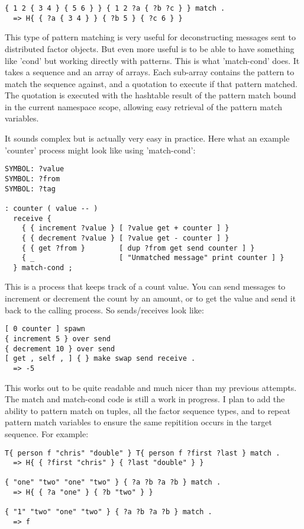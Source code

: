 \begin{verbatim}
{ 1 2 { 3 4 } { 5 6 } } { 1 2 ?a { ?b ?c } } match .
  => H{ { ?a { 3 4 } } { ?b 5 } { ?c 6 } }
\end{verbatim}


This type of pattern matching is very useful for deconstructing messages sent to distributed factor objects. But even more useful is to be able to have something like 'cond' but working directly with patterns. This is what 'match-cond' does. It takes a sequence and an array of arrays. Each sub-array contains the pattern to match the sequence against, and a quotation to execute if that pattern matched. The quotation is executed with the hashtable result of the pattern match bound in the current namespace scope, allowing easy retrieval of the pattern match variables.

It sounds complex but is actually very easy in practice. Here what an
example 'counter' process might look like using 'match-cond':

\begin{verbatim}
SYMBOL: ?value
SYMBOL: ?from
SYMBOL: ?tag

: counter ( value -- )
  receive {
    { { increment ?value } [ ?value get + counter ] }
    { { decrement ?value } [ ?value get - counter ] }
    { { get ?from }        [ dup ?from get send counter ] }
    { _                    [ "Unmatched message" print counter ] }
  } match-cond ;

\end{verbatim}

This is a process that keeps track of a count value. You can send messages to increment or decrement the count by an amount, or to get the value and send it back to the calling process. So sends/receives look like:

\begin{verbatim}
[ 0 counter ] spawn
{ increment 5 } over send
{ decrement 10 } over send
[ get , self , ] { } make swap send receive .
  => -5
\end{verbatim}


This works out to be quite readable and much nicer than my previous attempts. The match and match-cond code is still a work in progress. I plan to add the ability to pattern match on tuples, all the factor sequence types, and to repeat pattern match variables to ensure the same repitition occurs in the target sequence. For example:

\begin{verbatim}
T{ person f "chris" "double" } T{ person f ?first ?last } match .
  => H{ { ?first "chris" } { ?last "double" } }

{ "one" "two" "one" "two" } { ?a ?b ?a ?b } match .
  => H{ { ?a "one" } { ?b "two" } }

{ "1" "two" "one" "two" } { ?a ?b ?a ?b } match .
  => f
\end{verbatim}


